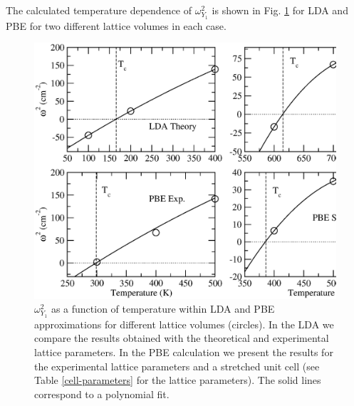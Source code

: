 The calculated temperature dependence of $\omega_{Y_{1}}^{2}$ is shown in Fig. \ref{freq-y1-snse} for LDA and PBE for two different lattice volumes in each case.
\begin{figure}[h]
\begin{center}
\includegraphics[width=0.9\linewidth]{Figures/freq-main-snse.eps}
\caption[Phonon collapse in SnSe.]{$\omega_{Y_{1}}^{2}$ as a function of temperature within LDA and PBE approximations for different lattice volumes (circles). In the LDA we compare the results obtained with the theoretical and 
experimental\cite{zhao2014ultralow} lattice parameters. In the PBE calculation we present the results for the experimental lattice parameters and a stretched unit cell (see Table \ref{cell-parameters} for the lattice
parameters). The solid lines correspond to a polynomial fit.}
\label{freq-y1-snse}
\end{center}
\end{figure}
